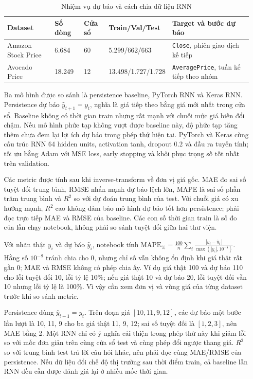 \documentclass[12pt,a4paper]{report}
\begin{document}
\begin{table}[htbp]\centering\caption{Nhiệm vụ dự báo và cách chia dữ liệu RNN}\label{tab:rnn-split}
\footnotesize\begin{tabularx}{\textwidth}{p{2.5cm}p{1.3cm}p{1.3cm}p{3cm}X}
\toprule\textbf{Dataset} & \textbf{Số dòng} & \textbf{Cửa sổ} & \textbf{Train/Val/Test} & \textbf{Target và bước dự báo}\\\midrule
Amazon Stock Price & 6.684 & 60 & 5.299/662/663 & \texttt{Close}, phiên giao dịch kế tiếp\\
Avocado Price & 18.249 & 12 & 13.498/1.727/1.728 & \texttt{AveragePrice}, tuần kế tiếp theo nhóm\\
\bottomrule\end{tabularx}\end{table}

Ba mô hình được so sánh là persistence baseline, PyTorch RNN và Keras RNN. Persistence dự báo $\hat y_{t+1}=y_t$, nghĩa là giá tiếp theo bằng giá mới nhất trong cửa sổ. Baseline không có thời gian train nhưng rất mạnh với chuỗi mức giá biến đổi chậm. Nếu mô hình phức tạp không vượt được baseline này, độ phức tạp tăng thêm chưa đem lại lợi ích dự báo trong phép thử hiện tại. PyTorch và Keras cùng cấu trúc RNN 64 hidden units, activation tanh, dropout 0.2 và đầu ra tuyến tính; tối ưu bằng Adam với MSE loss, early stopping và khôi phục trọng số tốt nhất trên validation.

Các metric được tính sau khi inverse-transform về đơn vị giá gốc. MAE đo sai số tuyệt đối trung bình, RMSE nhấn mạnh dự báo lệch lớn, MAPE là sai số phần trăm trung bình và $R^2$ so với dự đoán trung bình của test. Với chuỗi giá có xu hướng mạnh, $R^2$ cao không đảm bảo mô hình dự báo tốt hơn persistence; phải đọc trực tiếp MAE và RMSE của baseline. Các con số thời gian train là số đo của lần chạy notebook, không phải so sánh tuyệt đối giữa hai thư viện.

Với nhãn thật $y_i$ và dự báo $\hat y_i$, notebook tính $\mathrm{MAPE}_{\%}=\frac{100}{n}\sum_i\frac{|y_i-\hat y_i|}{\max(|y_i|,10^{-8})}$. Hằng số $10^{-8}$ tránh chia cho 0, nhưng chỉ số vẫn không ổn định khi giá thật rất gần 0; MAE và RMSE không có phép chia ấy. Ví dụ giá thật 100 và dự báo 110 cho lỗi tuyệt đối 10, lỗi tỷ lệ 10\%; nếu giá thật 10 và dự báo 20, lỗi tuyệt đối vẫn 10 nhưng lỗi tỷ lệ là 100\%. Vì vậy cần xem đơn vị và vùng giá của từng dataset trước khi so sánh metric.

Persistence dùng $\hat y_{t+1}=y_t$. Trên đoạn giá $[10,11,9,12]$, các dự báo một bước lần lượt là 10, 11, 9 cho ba giá thật 11, 9, 12; sai số tuyệt đối là $[1,2,3]$, nên MAE bằng 2. Một RNN chỉ có ý nghĩa cải thiện trong phép thử này khi giảm lỗi so với mốc đơn giản trên cùng cửa sổ test và cùng phép đổi ngược thang giá. $R^2$ so với trung bình test trả lời câu hỏi khác, nên phải đọc cùng MAE/RMSE của persistence. Nếu dữ liệu đổi chế độ thị trường sau thời điểm train, cả baseline lẫn RNN đều cần được đánh giá lại ở nhiều mốc thời gian.
\end{document}
